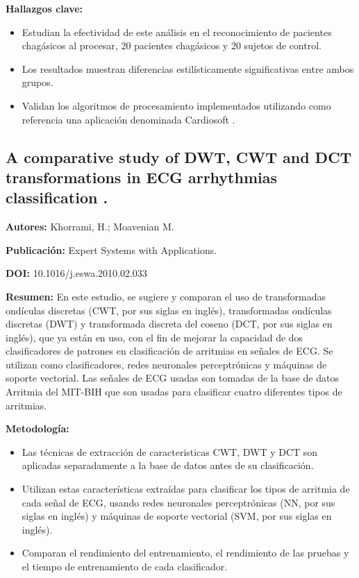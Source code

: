 \documentclass[12pt,letterpaper,oneside,openright]{book}
\begin{document}
\textbf{Hallazgos clave:}
\begin{itemize}
	\item Estudian la efectividad de este análisis en el reconocimiento de pacientes chagásicos al procesar, 20 pacientes chagásicos y 20 sujetos de control.
	\item Los resultados muestran diferencias estilísticamente significativas entre ambos grupos.
	\item Validan los algoritmos de procesamiento implementados utilizando como referencia una aplicación denominada Cardiosoft \cite{cardiosoft}.
\end{itemize}

\subsection{A comparative study of DWT, CWT and DCT transformations in ECG arrhythmias classification \cite{Khorrami10}.}
\textbf{Autores:} Khorrami, H.; Moavenian M.
 
\textbf{Publicación:} Expert Systems with Applications.

\textbf{DOI:} 10.1016/j.eswa.2010.02.033

\textbf{Resumen:} En este estudio, se sugiere y comparan el uso de transformadas ondículas discretas (CWT, por sus siglas en inglés), transformadas ondículas discretas (DWT) y transformada discreta del coseno (DCT, por sus siglas en inglés), que ya están en uso, con el fin de mejorar la capacidad de dos clasificadores de patrones en clasificación de arritmias en señales de ECG. Se utilizan como clasificadores, redes neuronales perceptrónicas y máquinas de soporte vectorial. Las señales de ECG usadas son tomadas de la base de datos Arritmia del MIT-BIH que son usadas para clasificar cuatro diferentes tipos de arritmias. 

\textbf{Metodología:}
\begin{itemize}
	\item Las técnicas de extracción de caracteristicas CWT, DWT y DCT son aplicadas separadamente a la base de datos antes de su clasificación.
	\item Utilizan estas características extraídas para clasificar los tipos de arritmia de cada señal de ECG, usando redes neuronales perceptrónicas (NN, por sus siglas en inglés) y máquinas de soporte vectorial (SVM, por sus siglas en inglés).
	\item Comparan el rendimiento del entrenamiento, el rendimiento de las pruebas y el tiempo de entrenamiento de cada clasificador. 
\end{itemize}
\end{document}
